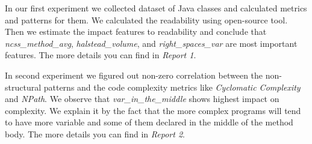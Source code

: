 In our first experiment we collected dataset of Java classes and calculated 
metrics and patterns for them. We calculated the readability using open-source
tool. Then we estimate the impact features to readability and conclude that
\emph{ncss\_method\_avg}, \emph{halstead\_volume}, and \emph{right\_spaces\_var} are
most important features. The more details you can find in \emph{Report 1}.

In second experiment we figured out non-zero correlation between the 
non-structural patterns and the code complexity metrics like \emph{Cyclomatic Complexity}
and \emph{NPath}. We observe that \emph{var\_in\_the\_middle} shows  
highest impact on complexity. We explain it by the fact that the more complex 
programs will  tend to have more variable and some of them declared in the middle
of the method body. The more details you can find in \emph{Report 2}.


